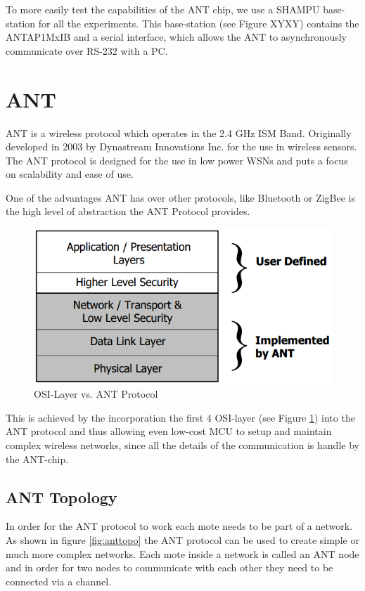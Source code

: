 To more easily test the capabilities of the ANT chip, we use a SHAMPU base-station for all the experiments. This base-station (see Figure XYXY) contains the ANTAP1MxIB and a serial interface, which allows the ANT to asynchronously communicate over RS-232 with a PC. 

\section{ANT}
ANT \cite{DynastreamInnovationsInc.2013} is a wireless protocol which operates in the 2.4 GHz ISM Band. Originally developed in 2003 by Dynastream Innovations Inc. for the use in wireless sensors. The ANT protocol is designed for the use in low power WSNs and puts a focus on scalability and ease of use.

One of the advantages ANT has over other protocols, like Bluetooth or ZigBee is the high level of abstraction the ANT Protocol provides. 
\begin{figure}[H]
	\centering
	\includegraphics[scale=.5]{./pics/ANTstack.png}
	\caption{OSI-Layer vs. ANT Protocol}\label{fig:osilayer}
\end{figure}

This is achieved by the incorporation the first 4 OSI-layer (see Figure \ref{fig:osilayer}) into the ANT protocol and thus allowing even low-cost MCU to setup and maintain complex wireless networks, since all the details of the communication is handle by the ANT-chip.

\subsection{ANT Topology}
In order for the ANT protocol to work each mote needs to be part of a network. As shown in figure \ref{fig:anttopo} the ANT protocol can be used to create simple or much more complex networks. Each mote inside a network is called an ANT node and in order for two nodes to communicate with each other they need to be connected via a channel.

